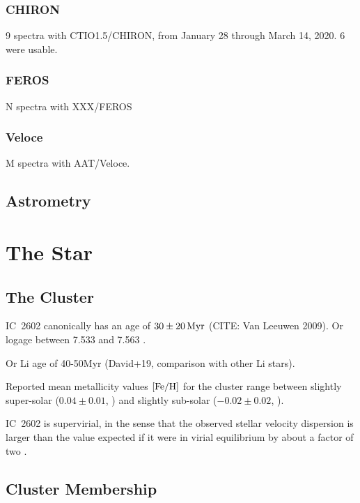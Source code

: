 \documentclass[12pt,twocolumn,tighten]{aastex62}
\begin{document}
\subsubsection{CHIRON}
9 spectra with CTIO1.5/CHIRON, from January 28 through March 14, 2020.
6 were usable.

\subsubsection{FEROS}
N spectra with XXX/FEROS

\subsubsection{Veloce}
M spectra with AAT/Veloce.

\subsection{Astrometry}


\section{The Star}
\label{sec:star}

\subsection{The Cluster}
\label{subsec:cluster}


IC~2602 canonically has an age of $30\pm20\,{\rm Myr}$ (CITE: Van
Leeuwen 2009).
Or logage between 7.533 and 7.563	\citep{bossini_age_2019}.

Or Li age of 40-50Myr (David+19, comparison with other Li stars).

Reported mean metallicity values ${\rm [Fe/H]}$ for the cluster range between
slightly super-solar ($0.04\pm0.01$, \citealt{baratella_gaia-eso_2020}) and
slightly sub-solar ($-0.02 \pm 0.02$, \citealt{netopil_metallicity_2016}).

IC~2602 is supervirial, in the sense that the observed stellar velocity
dispersion is larger than the value expected if it were in virial equilibrium
by about a factor of two \citep{bravi_gaia-eso_2018}.


\subsection{Cluster Membership}
\label{subsec:member}
\end{document}
